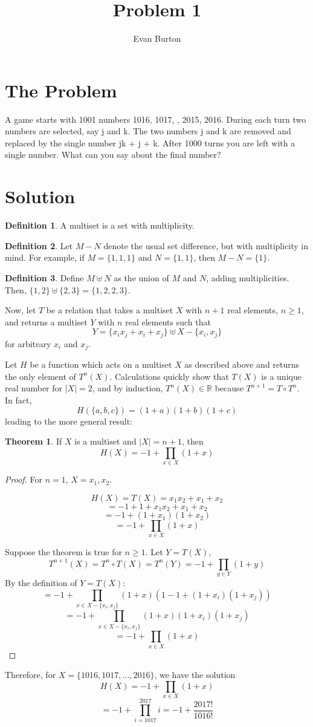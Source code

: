 \documentclass[]{article}
\title{Problem 1}
\author{Evan Burton}
\theoremstyle{definition}
\newtheorem{definition}{\textbf{Definition}}[section]
\newtheorem*{theorem}{Theorem}
\begin{document}
\maketitle

\section{The Problem}
A game starts with 1001 numbers 1016, 1017, , 2015, 2016. During each turn two numbers are selected, say j and k. The two numbers j and k are removed and replaced by the single number jk + j + k. After 1000 turns you are left with a single number. What can you say about the final number?

\section{Solution}
\begin{definition}
	A multiset is a set with multiplicity.
\end{definition}

\begin{definition}
	Let $M-N$ denote the usual set difference, but with multiplicity in mind. For example, if $M = \{1, 1, 1\}$ and $N = \{1, 1\}$, then $M-N = \{1\}$.
\end{definition}

\begin{definition}
	Define $M \uplus N$ as the union of $M$ and $N$, adding multiplicities. Then, $\{1, 2\} \uplus \{2, 3\} = \{1, 2, 2, 3\}$.
\end{definition}

Now, let $T$ be a relation that takes a multiset $X$ with $n+1$ real elements, $n \geq 1$, and returns a multiset $Y$ with $n$ real elements such that \[Y = \{x_i x_j + x_i + x_j\} \uplus X - \{x_i, x_j\}\] for arbitrary $x_i$ and $x_j$. 

Let $H$ be a function which acts on a multiset $X$ as described above and returns the only element of $ T^n(X)$.
Calculations quickly show that $T(X)$ is a unique real number for $|X| = 2$, and by induction, $T^n(X) \in \mathbb{R}$ because $T^{n+1} = T \circ T^n$. In fact, \[H(\{a, b, c\}) = (1+a)(1+b)(1+c)\]
leading to the more general result:

\begin{theorem}
	If $X$ is a multiset and $|X| = n+1$, then \[H(X) = -1 + \prod_{x \in X} (1+x)\]
	
	\begin{proof}
		For $n = 1$, $X = {x_1, x_2}$.
		
		\[H(X) = T(X) = x_1 x_2 + x_1 + x_2\]
		\[ = -1 + 1 + x_1 x_2 + x_1 + x_2\]
		\[= -1 + (1+x_1)(1+x_2)\]
		\[= -1 + \prod_{x \in X} (1+x)\]
		
		Suppose the theorem is true for $n \geq 1$. Let $Y = T(X)$,
		\[T^{n+1}(X) = T^n \circ T(X) = T^n(Y) = -1 + \prod_{y \in Y} (1+y)\]
		By the definition of $Y = T(X)$:
		\[= -1 + \prod_{x \in X-\{x_i, x_j\}} (1+x)(1-1+(1+x_i)(1+x_j))\]
		\[= -1 + \prod_{x \in X-\{x_i, x_j\}}(1+x)(1+x_i)(1+x_j)\]
		\[= -1 + \prod_{x \in X}(1+x)\]
		
	\end{proof}
\end{theorem}

Therefore, for $X = \{1016, 1017, \dots, 2016\}$, we have the solution
 \[H(X) = -1 + \prod_{x \in X}(1+x)\]
 \[= -1 + \prod_{i = 1017}^{2017} i = -1 + \frac{2017!}{1016!}\]
\end{document}
